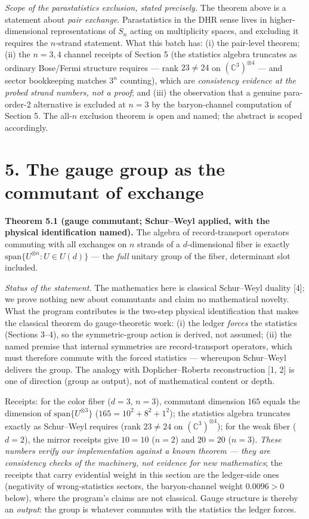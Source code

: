\documentclass[11pt]{article}
\begin{document}
\emph{Scope of the parastatistics exclusion, stated precisely.}  The theorem above is a statement about \emph{pair exchange}.  Parastatistics in the DHR sense lives in higher-dimensional representations of $S_n$ acting on multiplicity spaces, and excluding it requires the $n$-strand statement.  What this batch has: (i) the pair-level theorem; (ii) the $n = 3, 4$ channel receipts of Section 5 (the statistics algebra truncates as ordinary Bose/Fermi structure requires — rank $23 \neq 24$ on $(\mathbb C^3)^{\otimes 4}$ — and sector bookkeeping matches $3^n$ counting), which are \emph{consistency evidence at the probed strand numbers, not a proof}; and (iii) the observation that a genuine para-order-2 alternative is excluded at $n = 3$ by the baryon-channel computation of Section 5.  The all-$n$ exclusion theorem is open and named; the abstract is scoped accordingly.

\section*{5. The gauge group as the commutant of exchange}
\textbf{Theorem 5.1 (gauge commutant; Schur–Weyl applied, with the physical identification named).}  The algebra of record-transport operators commuting with all exchanges on $n$ strands of a $d$-dimensional fiber is exactly $\mathrm{span}\{U^{\otimes n} : U \in U(d)\}$ — the \emph{full} unitary group of the fiber, determinant slot included.

\emph{Status of the statement.}  The mathematics here is classical Schur–Weyl duality [4]; we prove nothing new about commutants and claim no mathematical novelty.  What the program contributes is the two-step physical identification that makes the classical theorem do gauge-theoretic work: (i) the ledger \emph{forces} the statistics (Sections 3–4), so the symmetric-group action is derived, not assumed; (ii) the named premise that internal symmetries are record-transport operators, which must therefore commute with the forced statistics — whereupon Schur–Weyl delivers the group.  The analogy with Doplicher–Roberts reconstruction [1, 2] is one of direction (group as output), not of mathematical content or depth.

Receipts: for the color fiber ($d = 3$, $n = 3$), commutant dimension $165$ equals the dimension of $\mathrm{span}\{U^{\otimes 3}\}$ ($165 = 10^2 + 8^2 + 1^2$); the statistics algebra truncates exactly as Schur–Weyl requires (rank $23 \neq 24$ on $(\mathbb C^3)^{\otimes 4}$); for the weak fiber ($d = 2$), the mirror receipts give $10 = 10$ ($n = 2$) and $20 = 20$ ($n = 3$).  \emph{These numbers verify our implementation against a known theorem — they are consistency checks of the machinery, not evidence for new mathematics}; the receipts that carry evidential weight in this section are the ledger-side ones (negativity of wrong-statistics sectors, the baryon-channel weight $0.0096 > 0$ below), where the program's claims are not classical. Gauge structure is thereby an \emph{output}: the group is whatever commutes with the statistics the ledger forces.
\end{document}
